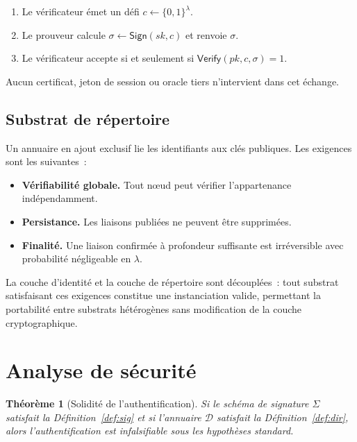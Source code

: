 \documentclass[11pt,a4paper]{article}
\newtheorem{theoreme}{Théorème}[section]
\begin{document}
\begin{enumerate}[leftmargin=*]
  \item Le vérificateur émet un défi $c \gets \{0,1\}^\lambda$.
  \item Le prouveur calcule $\sigma \gets \mathsf{Sign}(sk, c)$ et renvoie $\sigma$.
  \item Le vérificateur accepte si et seulement si $\mathsf{Verify}(pk, c, \sigma) = 1$.
\end{enumerate}

Aucun certificat, jeton de session ou oracle tiers n'intervient dans cet échange.

\subsection{Substrat de répertoire}

Un annuaire en ajout exclusif lie les identifiants aux clés publiques.  Les
exigences sont les suivantes~:

\begin{itemize}[leftmargin=*]
  \item \textbf{Vérifiabilité globale.}  Tout nœud peut vérifier
    l'appartenance indépendamment.
  \item \textbf{Persistance.}  Les liaisons publiées ne peuvent être supprimées.
  \item \textbf{Finalité.}  Une liaison confirmée à profondeur suffisante est
    irréversible avec probabilité négligeable en $\lambda$.
\end{itemize}

La couche d'identité et la couche de répertoire sont découplées~: tout
substrat satisfaisant ces exigences constitue une instanciation valide,
permettant la portabilité entre substrats hétérogènes sans modification de
la couche cryptographique.

\section{Analyse de sécurité}

\begin{theoreme}[Solidité de l'authentification]
  \label{thm:solidite}
  Si le schéma de signature $\Sigma$ satisfait la Définition~\ref{def:sig}
  et si l'annuaire $\mathcal{D}$ satisfait la Définition~\ref{def:dir},
  alors l'authentification est infalsifiable sous les hypothèses standard.
\end{theoreme}
\end{document}
